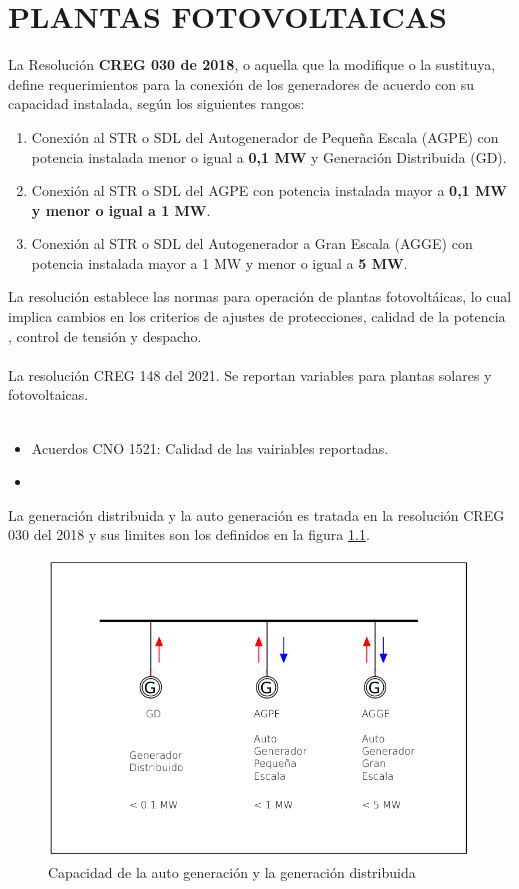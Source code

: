 \documentclass[a5paper]{book}%
\begin{document}
\chapter{PLANTAS FOTOVOLTAICAS}


La Resolución \textbf{CREG 030 de 2018}, o aquella que la modifique o la sustituya, define requerimientos para la conexión de los generadores de acuerdo con su capacidad instalada,
según los siguientes rangos:

\begin{enumerate}
	\item Conexión al STR o SDL del Autogenerador de Pequeña Escala (AGPE) con potencia 	instalada menor o igual a \textbf{0,1 MW} y Generación Distribuida (GD).
	\item  Conexión al STR o SDL del AGPE con potencia instalada mayor a \textbf{0,1 MW y menor o
	igual a 1 MW}.
	\item Conexión al STR o SDL del Autogenerador a Gran Escala (AGGE) con potencia instalada mayor a 1 MW y menor o igual a \textbf{5 MW}.
\end{enumerate}


La resolución \cite{CREG-060-2019} establece las normas para operación
de plantas fotovoltáicas, lo  cual implica cambios en los criterios de ajustes de protecciones, calidad de la potencia ,  control de tensión y despacho.\\\\

La resolución CREG 148 del 2021. Se reportan variables para plantas solares y fotovoltaicas.\\\\

\begin{itemize}
\item Acuerdos CNO 1521: Calidad de las vairiables reportadas.
\item
\end{itemize}

La generación distribuida  y la auto generación es tratada en la resolución CREG 030 del 2018 y sus limites son los definidos en la figura \ref{fig:gd}.

\begin{figure}[H]
	\centering
	\includegraphics[width=0.7\linewidth]{gd}
	\caption{Capacidad de la auto generación y la generación distribuida}
	\label{fig:gd}
      \end{figure}
      
\end{document}

